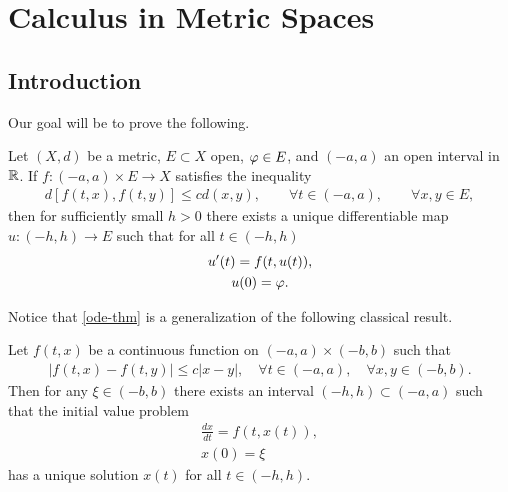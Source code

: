 \chapter{Calculus in Metric Spaces}
\section{Introduction}
%
%
%
%
%
%
%
%
%
%
%


Our goal will be to prove the following.
%
%
%
%
%
%
%
%
\begin{theorem}
	\label{ode-thm}
  Let $(X,d)$ be a metric, $E \subset X$ open, $\varphi \in E$, and $(-a, a)$ an
	open interval in $\mathbb{R}$. If $f: (-a, a) \times E \to X$ satisfies the
	inequality
	\begin{equation}
		\label{stronger-ode}
		\begin{split}
      d[f(t, x), f(t, y)] \le c d(x, y), \qquad \forall t \in (-a, a),
			\qquad \forall x, y \in E,
		\end{split}
	\end{equation}
  then for sufficiently small $h > 0$ there exists a unique
	differentiable map $u: (-h, h) \to E$ such that for all $t \in (-h, h)$
	\begin{gather}
    \label{ode-thm-eq}
			u'(t) = f(t, u(t)),
			\\
      \label{ode-thm-init-data}
			u(0) = \varphi.
	\end{gather}
\end{theorem}
%
%
Notice that \autoref{ode-thm} is a 
generalization of the following classical result.
%
%
%
%
%
%
%
%
\begin{theorem}
	Let $f(t, x)$ be a continuous function on $(- a, a) \times (- b,
	b)$ such that
	\begin{equation*}
		\begin{split}
			| f(t, x) - f(t, y) | \le c| x - y |, \quad \forall t \in (-a, a),
			\quad \forall x,y \in (- b, b).
		\end{split}
	\end{equation*}
	Then for any $\xi \in (-b, b)$ there exists an interval $(-h, h)
	\subset (-a, a)$ such that the initial value problem
	\begin{gather}
			\frac{dx}{dt} = f(t, x(t)),
			\\
			x(0) = \xi 
	\end{gather}
	has a unique solution $x(t)$ for all $t \in (-h, h)$.
	\end{theorem}
